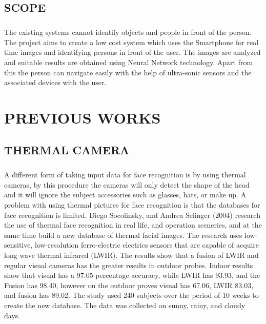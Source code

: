 \documentclass[10pt,a4paper,twoside]{report}
\begin{document}
\section{SCOPE}
\paragraph{ }The existing systems cannot identify objects and people in front of the person. The project aims to create a low cost system which uses the Smartphone for real time images and identifying persons in front of the user. The images are analyzed and suitable results are obtained using Neural Network technology. Apart from this the person can navigate easily with the help of ultra-sonic sensors and the associated devices with the user.

\chapter{PREVIOUS WORKS}

\section{THERMAL CAMERA}
\paragraph{ }A different form of taking input data for face recognition is by using thermal cameras, by this procedure the cameras will only detect the shape of the head and it will ignore the subject accessories such as glasses, hats, or make up. A problem with using thermal pictures for face recognition is that the databases for face recognition is limited. Diego Socolinsky, and Andrea Selinger (2004) research the use of thermal face recognition in real life, and operation sceneries, and at the same time build a new database of thermal facial images. The research uses low-sensitive, low-resolution ferro-electric electrics sensors that are capable of acquire long wave thermal infrared (LWIR). The results show that a fusion of LWIR and regular visual cameras has the greater results in outdoor probes. Indoor results show that visual has a 97.05 percentage accuracy, while LWIR has 93.93, and the Fusion has 98.40, however on the outdoor proves visual has 67.06, LWIR 83.03, and fusion has 89.02. The study used 240 subjects over the period of 10 weeks to create the new database. The data was collected on sunny, rainy, and cloudy days.
\end{document}
